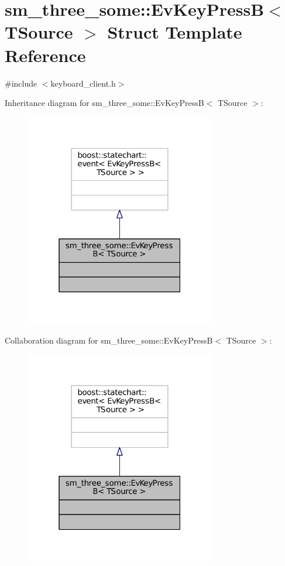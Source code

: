 \hypertarget{structsm__three__some_1_1EvKeyPressB}{}\section{sm\+\_\+three\+\_\+some\+:\+:Ev\+Key\+PressB$<$ T\+Source $>$ Struct Template Reference}
\label{structsm__three__some_1_1EvKeyPressB}


{\ttfamily \#include $<$keyboard\+\_\+client.\+h$>$}



Inheritance diagram for sm\+\_\+three\+\_\+some\+:\+:Ev\+Key\+PressB$<$ T\+Source $>$\+:
\nopagebreak
\begin{figure}[H]
\begin{center}
\leavevmode
\includegraphics[width=235pt]{structsm__three__some_1_1EvKeyPressB__inherit__graph}
\end{center}
\end{figure}


Collaboration diagram for sm\+\_\+three\+\_\+some\+:\+:Ev\+Key\+PressB$<$ T\+Source $>$\+:
\nopagebreak
\begin{figure}[H]
\begin{center}
\leavevmode
\includegraphics[width=235pt]{structsm__three__some_1_1EvKeyPressB__coll__graph}
\end{center}
\end{figure}


